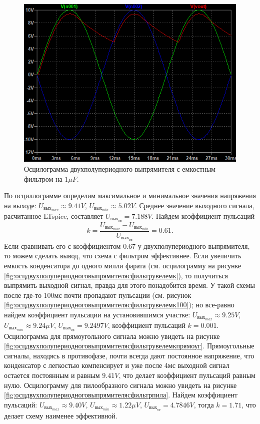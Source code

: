 \begin{figure}[htbp]
    \centering
    \includegraphics[width=0.8\linewidth]{figs/осц_двухполупериод_выпр_с_фильтром.png}
    \caption{Осцилограмма двухполупериодного выпрямителя с емкостным фильтром на $1\mu F$.}
    \label{fig:осцдвухполупериодноговыпрямителясфильтром}
\end{figure}

По осциллограмме определим максимальное и минимальное значения напряжения на выходе: 
$U_{\text{вых}_{max}}\approx 9.41V$, $U_{\text{вых}_{min}}\approx 5.02V$. Среднее значение выходного
сигнала, расчитанное LTspice, составляет $U_{\text{вых}_{\text{ср}}}= 7.188V$.
Найдем коэффициент пульсаций
$$
k=\frac{U_{\text{вых}_{max}} - U_{\text{вых}_{min}}}{U_{\text{вых}_{\text{ср}}}}=0.61.
$$
Если сравнивать его с коэффициентом $0.67$ у двухполупериодного выпрямителя, 
то можем сделать вывод, что схема с фильтром эффективнее. Если увеличить емкость конденсатора
до одного милли фарата (см. осцилограмму на рисунке \ref{fig:осцдвухполупериодноговыпрямителясфильтрувелемк}), то получиться выпрямить выходной сигнал, 
правда для этого понадобится время. У такой схемы после где-то 100мс почти пропадают пульсации 
(см. рисунок \ref{fig:осцдвухполупериодноговыпрямителясфильтрувелемк100}); но все-равно найдем
коэффициент пульсации на установившимся участке:
$U_{\text{вых}_{max}}\approx 9.25V$, 
$U_{\text{вых}_{min}}\approx 9.24\mu V$,
$U_{\text{вых}_{\text{ср}}}= 9.2497V$, коэффициент пульсаций $k=0.001$. Осцилограмма 
для прямоугольного сигнала
можно увидеть на рисунке \ref{fig:осцдвухполупериодноговыпрямителясфильтрувелемкпрямоуг}. 
Прямоугольные сигналы,
находясь в противофазе, почти всегда дают постоянное напряжение, что конденсатор с легкостью 
компенсирует и уже после 4мс
выходной сигнал остается постоянным и равным $9.41V$, что делает коэффициент 
пульсаций равным нулю.
Осцилограмму для пилообразного сигнала можно увидеть на рисунке 
\ref{fig:осцдвухполупериодноговыпрямителясфильтрпила}.
Найдем коэффициент пульсаций:
$U_{\text{вых}_{max}}\approx 9.40V$, 
$U_{\text{вых}_{min}}\approx 1.22\mu V$,
$U_{\text{вых}_{\text{ср}}}= 4.7846V$, тогда $k=1.71$, что делает схему наименее
эффективной.


